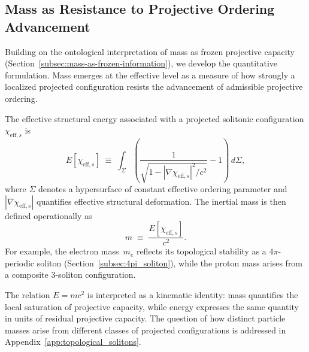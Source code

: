 \subsection{Mass as Resistance to Projective Ordering Advancement}
  \label{subsec:mass_as_resistance}

  Building on the ontological interpretation of mass as frozen projective
  capacity (Section~\ref{subsec:mass-as-frozen-information}), we develop
  the quantitative formulation.
  Mass emerges at the effective level as a measure of how strongly a
  localized projected configuration resists the advancement of admissible
  projective ordering.

  The effective structural energy associated with a projected solitonic
  configuration $\chi_{\mathrm{eff},s}$ is
  \begin{equation}
    E[\chi_{\mathrm{eff},s}] \;\equiv\;
    \int_{\Sigma}
    \left(
      \frac{1}{\sqrt{1
      - |\nabla \chi_{\mathrm{eff},s}|^2 / c^2}} - 1
    \right)
    \, d\Sigma ,
    \label{eq:chi_soliton_energy}
  \end{equation}
  where $\Sigma$ denotes a hypersurface of constant effective ordering
  parameter and $|\nabla \chi_{\mathrm{eff},s}|$ quantifies effective
  structural deformation.
  The inertial mass is then defined operationally as
  \begin{equation}
    m \;\equiv\; \frac{E[\chi_{\mathrm{eff},s}]}{c^2}.
    \label{eq:mass_definition}
  \end{equation}
  For example, the electron mass~$m_e$ reflects its topological stability as
  a $4\pi$-periodic soliton
  (Section~\ref{subsec:4pi_soliton}), while the proton mass arises from a
  composite 3-soliton configuration.

  The relation $E = mc^2$ is interpreted as a kinematic identity: mass
  quantifies the local saturation of projective capacity, while energy
  expresses the same quantity in units of residual projective capacity.
  The question of how distinct particle masses arise from different classes
  of projected configurations is addressed in
  Appendix~\ref{app:topological_solitons}.
